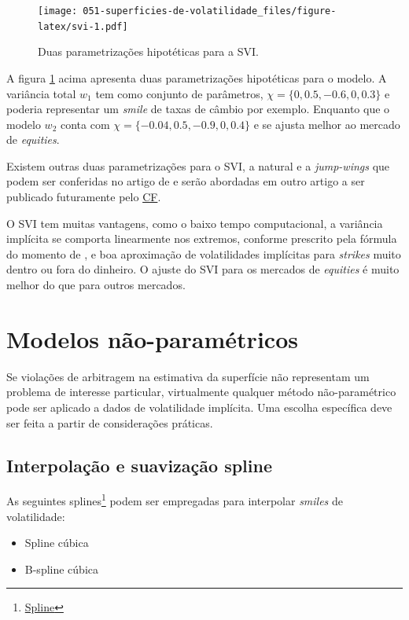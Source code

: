 \documentclass[]{book}
\providecommand{\tightlist}{%
  \setlength{\itemsep}{0pt}\setlength{\parskip}{0pt}}
\let\rmarkdownfootnote\footnote%
\def\footnote{\protect\rmarkdownfootnote}
\theoremstyle{definition}
\theoremstyle{definition}
\theoremstyle{definition}
\theoremstyle{remark}
\begin{document}
\begin{figure}
\centering
\texttt{[image: 051-superficies-de-volatilidade\_files/figure-latex/svi-1.pdf]}
\caption{\label{fig:svi}Duas parametrizações hipotéticas para a SVI.}
\end{figure}

A figura \ref{fig:svi} acima apresenta duas parametrizações hipotéticas
para o modelo. A variância total \(w_1\) tem como conjunto de
parâmetros, \(\chi = \{0, 0.5, -0.6, 0, 0.3\}\) e poderia representar um
\emph{smile} de taxas de câmbio por exemplo. Enquanto que o modelo
\(w_2\) conta com \(\chi = \{-0.04, 0.5, -0.9, 0, 0.4\}\) e se ajusta
melhor ao mercado de \emph{equities}.

Existem outras duas parametrizações para o SVI, a natural e a
\emph{jump-wings} que podem ser conferidas no artigo de
\citet{Gatheral2014} e serão abordadas em outro artigo a ser publicado
futuramente pelo \href{https://clubedefinancas.com.br}{CF}.

O SVI tem muitas vantagens, como o baixo tempo computacional, a
variância implícita se comporta linearmente nos extremos, conforme
prescrito pela fórmula do momento de \citet{Lee2004}, e boa aproximação
de volatilidades implícitas para \emph{strikes} muito dentro ou fora do
dinheiro. O ajuste do SVI para os mercados de \emph{equities} é muito
melhor do que para outros mercados.

\section{Modelos não-paramétricos}\label{modelos-nao-parametricos}

Se violações de arbitragem na estimativa da superfície não representam
um problema de interesse particular, virtualmente qualquer método
não-paramétrico pode ser aplicado a dados de volatilidade implícita. Uma
escolha específica deve ser feita a partir de considerações práticas.

\subsection{Interpolação e suavização
spline}\label{interpolacao-e-suavizacao-spline}

As seguintes splines\footnote{\href{https://en.wikipedia.org/wiki/Spline_interpolation}{Spline}}
podem ser empregadas para interpolar \emph{smiles} de volatilidade:

\begin{itemize}
\tightlist
\item
  Spline cúbica
\item
  B-spline cúbica
\end{itemize}
\end{document}
